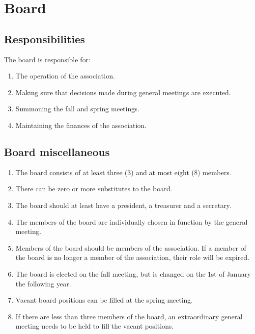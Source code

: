 \section*{Board}
\subsection{Responsibilities}
The board is responsible for:
\begin{enumerate}
  \item The operation of the association.
  \item Making sure that decisions made during general meetings are executed.
  \item Summoning the fall and spring meetings. 
  \item Maintaining the finances of the association. 
\end{enumerate}

\subsection{Board miscellaneous}
\begin{enumerate}
  \item The board consists of at least three (3) and at most eight (8) members.
  \item There can be zero or more substitutes to the board.
  \item The board should at least have a president, a treasurer and a secretary.
  \item The members of the board are individually chosen in function by the general meeting.
  \item Members of the board should be members of the association. If a member of the board is no longer a member of the association, their role will be expired.
  \item The board is elected on the fall meeting, but is changed on the 1st of January the following year.
  \item Vacant board positions can be filled at the spring meeting.
  \item If there are less than three members of the board, an extraordinary general meeting needs to be held to fill the vacant positions.
\end{enumerate}

